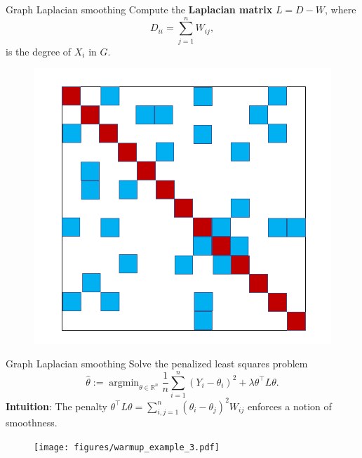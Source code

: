 \documentclass[xcolor=dvipsnames]{beamer}
\newcommand{\Reals}{\mathbb{R}}
\newcommand{\wh}[1]{\widehat{#1}}
\DeclareMathOperator*{\argmin}{argmin}
\begin{document}
\begin{frame}[t]{Graph Laplacian smoothing}
Compute the {\bf Laplacian matrix} $L = D - W$, where 
\begin{equation*}
D_{ii} = \sum_{j = 1}^{n} W_{ij},
\end{equation*}
is the degree of $X_i$ in $G$.
\vspace{.2cm}
\begin{figure}
	\centering
	\includegraphics[height=.4\textheight]{figures/laplacian_matrix.png}
\end{figure}
\end{frame}

\begin{frame}[t]{Graph Laplacian smoothing}
Solve the penalized least squares problem
\begin{equation*}
\wh{\theta} := \argmin_{\theta \in \Reals^n} \frac{1}{n}\sum_{i = 1}^{n}(Y_i - \theta_i)^2 + \lambda \theta^{\top} L \theta.
\end{equation*}
{\bf Intuition}: The penalty $\theta^{\top} L \theta = \sum_{i,j = 1}^{n} (\theta_i - \theta_j)^2 W_{ij}$ enforces a notion of smoothness.
\pause
\begin{figure}
	\centering
	\texttt{[image: figures/warmup\_example\_3.pdf]}
\end{figure}
\end{frame}
\end{document}
